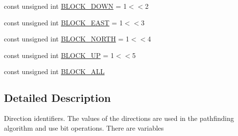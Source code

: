 \begin{DoxyCompactItemize}
\item 
const unsigned int \hyperlink{namespacedirections_aee5c7106d29fd47f5dedb475537fa6ad}{B\-L\-O\-C\-K\-\_\-\-D\-O\-W\-N} = 1$<$$<$2
\item 
const unsigned int \hyperlink{namespacedirections_aeafc68d54c090e0e7fc49c20f75f6f71}{B\-L\-O\-C\-K\-\_\-\-E\-A\-S\-T} = 1$<$$<$3
\item 
const unsigned int \hyperlink{namespacedirections_aafa10fc7e4d258d59153b41e0c3c3972}{B\-L\-O\-C\-K\-\_\-\-N\-O\-R\-T\-H} = 1$<$$<$4
\item 
const unsigned int \hyperlink{namespacedirections_a75d6cf52d7c325364a0288afdc7affd8}{B\-L\-O\-C\-K\-\_\-\-U\-P} = 1$<$$<$5
\item 
const unsigned int \hyperlink{namespacedirections_a3a3b00ffd9ec88e2780368bd7604e31b}{B\-L\-O\-C\-K\-\_\-\-A\-L\-L}
\end{DoxyCompactItemize}


\subsection{Detailed Description}
Direction identifiers. The values of the directions are used in the pathfinding algorithm and use bit operations. There are variables 


